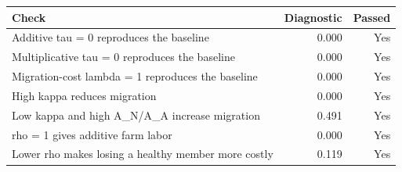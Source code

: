 \begin{tabular}{lrr}
\hline
Check & Diagnostic & Passed \\
\hline
Additive tau = 0 reproduces the baseline & 0.000 & Yes \\
Multiplicative tau = 0 reproduces the baseline & 0.000 & Yes \\
Migration-cost lambda = 1 reproduces the baseline & 0.000 & Yes \\
High kappa reduces migration & 0.000 & Yes \\
Low kappa and high A\_N/A\_A increase migration & 0.491 & Yes \\
rho = 1 gives additive farm labor & 0.000 & Yes \\
Lower rho makes losing a healthy member more costly & 0.119 & Yes \\
\hline
\end{tabular}
